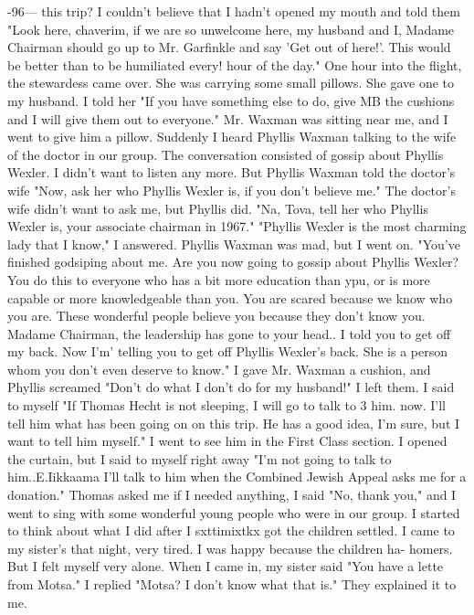 -96— 
this trip? I couldn't believe that I hadn't opened my mouth and told them "Look here, 
chaverim, if we are so unwelcome here, my husband and I, Madame Chairman should go up to 
Mr. Garfinkle and say 'Get out of here!'. This would be better than to be humiliated every! 
hour of the day." 
One hour into the flight, the stewardess came over. She was carrying some small 
pillows. She gave one to my husband. I told her "If you have something else to do, give 
MB the cushions and I will give them out to everyone." Mr. Waxman was sitting near me, 
and I went to give him a pillow. Suddenly I heard Phyllis Waxman talking to the wife of 
the doctor in our group. The conversation consisted of gossip about Phyllis Wexler. I 
didn't want to listen any more. But Phyllis Waxman told the doctor's wife "Now, ask her 
who Phyllis Wexler is, if you don't believe me." The doctor's wife didn't want to ask me, 
but Phyllis did. "Na, Tova, tell her who Phyllis Wexler is, your associate chairman 
in 1967." 
"Phyllis Wexler is the most charming lady that I know," I answered. Phyllis Waxman 
was mad, but I went on. "You've finished godsiping about me. Are you now going to 
gossip about Phyllis Wexler? You do this to everyone who has a bit more education than 
ypu, or is more capable or more knowledgeable than you. You are scared because we know 
who you are. These wonderful people believe you because they don't know you. Madame 
Chairman, the leadership has gone to your head.. I told you to get off my back. Now I'm' 
telling you to get off Phyllis Wexler's back. She is a person whom you don't even deserve 
to know." I gave Mr. Waxman a cushion, and Phyllis screamed "Don't do what I don't do for 
my husband!" 
I left them. I said to myself "If Thomas Hecht is not sleeping, I will go to talk to 3 
him. now. I'll tell him what has been going on on this trip. He has a good idea, I'm sure, 
but I want to tell him myself." I went to see him in the First Class section. I opened 
the curtain, but I said to myself right away "I'm not going to talk to him..E.Iikkaama I'll 
talk to him when the Combined Jewish Appeal asks me for a donation." Thomas asked me 
if I needed anything, I said "No, thank you," and I went to sing with some wonderful 
young people who were in our group. 
I started to think about what I did after I sxttimixtkx got the children settled. 
I came to my sister's that night, very tired. I was happy because the children ha-
homers. But I felt myself very alone. When I came in, my sister said "You have a lette 
from Motsa." I replied "Motsa? I don't know what that is." They explained it to me. 
